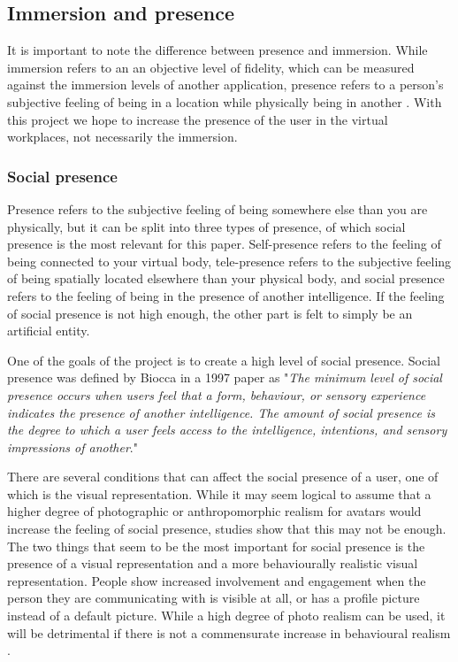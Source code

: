   
\subsection{Immersion and presence} \label{immersionAndPresence}
It is important to note the difference between presence and immersion. While immersion refers to an an objective level of fidelity, which can be measured against the immersion levels of another application, presence refers to a person's subjective feeling of being in a location while physically being in another \cite{slater2003note}. With this project we hope to increase the presence of the user in the virtual workplaces, not necessarily the immersion.

\subsubsection{Social presence}
\label{section:socialPrecence}
Presence refers to the subjective feeling of being somewhere else than you are physically, but it can be split into three types of presence, of which social presence is the most relevant for this paper. Self-presence refers to the feeling of being connected to your virtual body, tele-presence refers to the subjective feeling of being spatially located elsewhere than your physical body, and social presence refers to the feeling of being in the presence of another intelligence. If the feeling of social presence is not high enough, the other part is felt to simply be an artificial entity.

One of the goals of the project is to create a high level of social presence. Social presence was defined by Biocca in a 1997 paper as "\textit{The minimum level of social presence occurs when users feel that a form, behaviour, or sensory experience indicates the presence of another intelligence. The amount of social presence is the degree to which a user feels access to the intelligence, intentions, and sensory impressions of another}\cite{biocca1997cyborg}."

There are several conditions that can affect the social presence of a user, one of which is the visual representation. While it may seem logical to assume that a higher degree of photographic or anthropomorphic realism for avatars would increase the feeling of social presence, studies show that this may not be enough. The two things that seem to be the most important for social presence is the presence of a visual representation and a more behaviourally realistic visual representation. People show increased involvement and engagement when the person they are communicating with is visible at all, or has a profile picture instead of a default picture. While a high degree of photo realism can be used, it will be detrimental if there is not a commensurate increase in behavioural realism \cite{oh2018systematic}.

